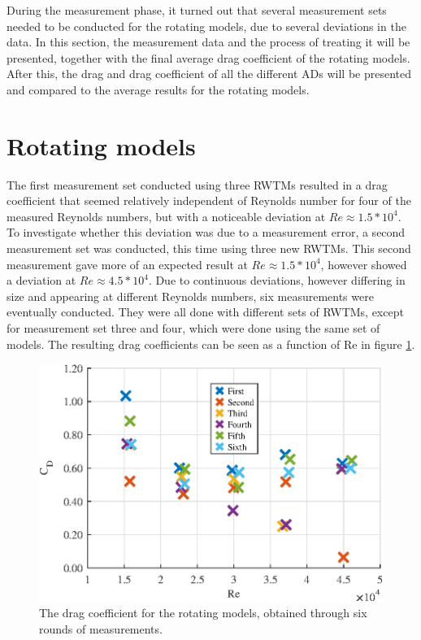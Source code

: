 
During the measurement phase, it turned out that several measurement sets needed to be conducted for the rotating models, due to several deviations in the data. In this section, the measurement data and the process of treating it will be presented, together with the final average drag coefficient of the rotating models. After this, the drag and drag coefficient of all the different \gls{AD}s will be presented and compared to the average results for the rotating models.  



\section{Rotating models}

The first measurement set conducted using three \gls{RWTM}s resulted in a drag coefficient that seemed relatively independent of Reynolds number for four of the measured Reynolds numbers, but with a noticeable deviation at $Re \approx 1.5*10^4$. To investigate whether this deviation was due to a measurement error, a second measurement set was conducted, this time using three new \gls{RWTM}s. This second measurement gave more of an expected result at $Re \approx 1.5*10^4$, however showed a deviation at $Re \approx 4.5*10^4$. Due to continuous deviations, however differing in size and appearing at different Reynolds numbers, six measurements were eventually conducted. They were all done with different sets of \gls{RWTM}s, except for measurement set three and four, which were done using the same set of models. The resulting drag coefficients can be seen as a function of Re in figure \ref{fig:RotationalCD}.

 

\begin{figure}
    \centering
    \includegraphics[width=0.8\linewidth]{0_Images/RotationalCDRe.eps}
    \caption[Drag coefficient for the rotating models.]{The drag coefficient for the rotating models, obtained through six rounds of measurements.}
    \label{fig:RotationalCD}
\end{figure}

